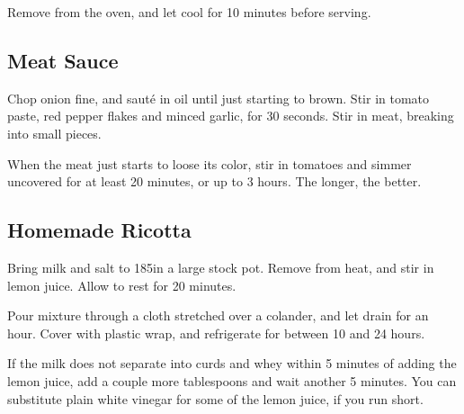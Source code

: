 \begin{recipe}
Remove from the oven, and let cool for 10 minutes before serving.

\subsection{Meat Sauce}



Chop onion fine, and sauté in oil until just starting to brown. Stir in tomato paste, red pepper flakes and minced garlic, for 30 seconds. Stir in meat, breaking into small pieces.

When the meat just starts to loose its color, stir in tomatoes and simmer uncovered for at least 20 minutes, or up to 3 hours. The longer, the better.

\subsection{Homemade Ricotta}


Bring milk and salt to 185\degree in a large stock pot. Remove from heat, and stir in lemon juice. Allow to rest for 20 minutes.

Pour mixture through a cloth stretched over a colander, and let drain for an hour. Cover with plastic wrap, and refrigerate for between 10 and 24 hours.

If the milk does not separate into curds and whey within 5 minutes of adding the lemon juice, add a couple more tablespoons and wait another 5 minutes. You can substitute plain white vinegar for some of the lemon juice, if you run short.


\end{recipe}
